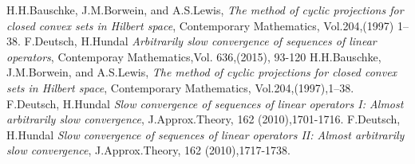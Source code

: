 \documentclass[11pt, a4paper]{amsart}
\begin{document}
\begin{thebibliography}{10} 
\addtolength{\leftmargin}{0.2in}
\setlength{\itemindent}{-0.2in}
 H.H.Bauschke, J.M.Borwein, and A.S.Lewis, \emph{The method of cyclic projections for closed
convex sets in Hilbert space}, Contemporary Mathematics, Vol.204,(1997) 1–38.
 F.Deutsch, H.Hundal \emph{Arbitrarily slow convergence of sequences of linear operators}, Contemporay Mathematics,Vol. 636,(2015), 93-120
 H.H.Bauschke, J.M.Borwein, and A.S.Lewis, \emph{The method of cyclic projections for closed
convex sets in Hilbert space}, Contemporary Mathematics, Vol.204,(1997),1–38.
F.Deutsch, H.Hundal \emph{Slow convergence of sequences of linear operators I: Almost
arbitrarily slow convergence}, J.Approx.Theory, 162 (2010),1701-1716.
F.Deutsch, H.Hundal \emph{Slow convergence of sequences of linear operators II: Almost
arbitrarily slow convergence}, J.Approx.Theory, 162 (2010),1717-1738.
 
\end{thebibliography}
\end{document}
